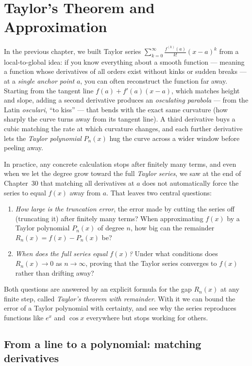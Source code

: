\chapter{Taylor's Theorem and Approximation}

In the previous chapter, we built Taylor series $\sum_{k=0}^\infty \frac{f^{(k)}(a)}{k!}(x-a)^k$
from a local-to-global idea: if you know everything about a smooth function --- meaning
a function whose derivatives of all orders exist without kinks or sudden breaks --- at a
\emph{single anchor point} $a$, you can often reconstruct the function far away. Starting from
the tangent line $f(a) + f'(a)(x-a)$, which matches height and slope, adding a second derivative
produces an \emph{osculating parabola} --- from the Latin \emph{osculari}, ``to kiss'' --- that
bends with the exact same curvature (how sharply the curve turns away from its tangent line). A
third derivative buys a cubic matching the rate at which curvature changes, and each further
derivative lets the \emph{Taylor polynomial} $P_n(x)$ hug the curve across a wider window before
peeling away.

In practice, any concrete calculation stops after finitely many terms, and even when we let the
degree grow toward the full \emph{Taylor series}, we saw at the end of Chapter~30 that matching
all derivatives at $a$ does not automatically force the series to equal $f(x)$ away from $a$.
That leaves two central questions:
\begin{enumerate}
  \item \emph{How large is the truncation error}, the error made by cutting the series off (truncating it) after finitely many terms? When approximating $f(x)$ by a Taylor polynomial $P_n(x)$ of degree $n$, how big can the remainder $R_n(x) = f(x) - P_n(x)$ be?
  \item \emph{When does the full series equal $f(x)$?} Under what conditions does $R_n(x) \to 0$ as $n \to \infty$, proving that the Taylor series converges to $f(x)$ rather than drifting away?
\end{enumerate}

Both questions are answered by an explicit formula for the gap $R_n(x)$ at any finite step,
called \emph{Taylor's theorem with remainder}. With it we can bound the error of a Taylor
polynomial with certainty, and see why the series reproduces functions like $e^x$ and
$\cos x$ everywhere but stops working for others.

\section{From a line to a polynomial: matching derivatives}

